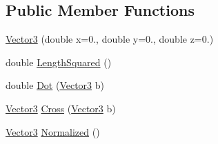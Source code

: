\subsection*{Public Member Functions}
\begin{DoxyCompactItemize}
\item 
\mbox{\hyperlink{struct_eagle_eye_1_1_models_1_1_geometry_1_1_vector3_aff7ecbf36104d15e3faad8f411fa0a5a}{Vector3}} (double x=0., double y=0., double z=0.)
\item 
double \mbox{\hyperlink{struct_eagle_eye_1_1_models_1_1_geometry_1_1_vector3_a78cf3bfb5db3b40b85478758b8419199}{Length\+Squared}} ()
\item 
double \mbox{\hyperlink{struct_eagle_eye_1_1_models_1_1_geometry_1_1_vector3_a49b888e998b726bb81dd37f41321b05b}{Dot}} (\mbox{\hyperlink{struct_eagle_eye_1_1_models_1_1_geometry_1_1_vector3}{Vector3}} b)
\item 
\mbox{\hyperlink{struct_eagle_eye_1_1_models_1_1_geometry_1_1_vector3}{Vector3}} \mbox{\hyperlink{struct_eagle_eye_1_1_models_1_1_geometry_1_1_vector3_ad6e110290dd96cccb44c11a18293f68e}{Cross}} (\mbox{\hyperlink{struct_eagle_eye_1_1_models_1_1_geometry_1_1_vector3}{Vector3}} b)
\item 
\mbox{\hyperlink{struct_eagle_eye_1_1_models_1_1_geometry_1_1_vector3}{Vector3}} \mbox{\hyperlink{struct_eagle_eye_1_1_models_1_1_geometry_1_1_vector3_a5c2d6883ccbc80bf1ff7baaaa4c909df}{Normalized}} ()
\end{DoxyCompactItemize}
